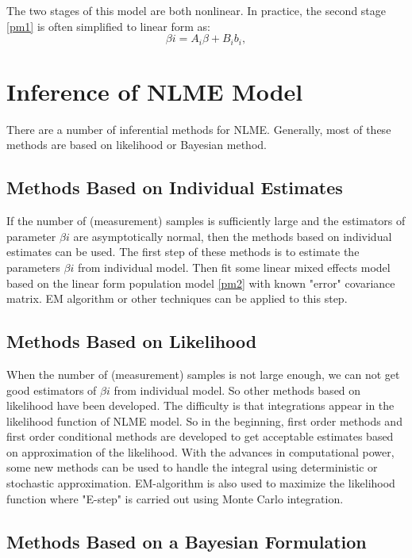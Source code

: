 \documentclass[12pt]{extarticle}
\begin{document}
The two stages of this model are both nonlinear. In practice, the second stage \eqref{pm1} is often simplified to linear form as:
\begin{equation}
\beta{i}=A_{i}\beta+B_{i}b_{i}, \label{pm2} 
\end{equation}

\section{Inference of NLME Model}
\label{sect:infer}
There are a number of inferential methods for NLME.  Generally, most of these methods are based on likelihood or Bayesian method.

\subsection{Methods Based on Individual Estimates} 
\label{sect:ie}
If the number of (measurement) samples is sufficiently large and the estimators of parameter $\beta{i}$ are asymptotically normal, then the methods based on individual estimates can be used. The first step of these methods is to estimate the parameters $\beta{i}$ from individual model. Then fit some linear mixed effects model based on the linear form population model \eqref{pm2} with known "error" covariance matrix. EM algorithm or other techniques can be applied to this step.

\subsection{Methods Based on  Likelihood}
\label{sect:likelihood}
When the number of (measurement) samples is not large enough, we can not get good estimators of  $\beta{i}$ from individual model. So other methods based on likelihood have been developed. The difficulty is that integrations appear in the likelihood function of NLME model. So in the beginning, first order methods and first order conditional methods are developed to get acceptable estimates based on approximation of the likelihood. With the advances in computational power, some new methods can be used to handle the integral using deterministic or stochastic approximation. EM-algorithm is also used to maximize the likelihood function where "E-step" is carried out using Monte Carlo integration.

\subsection{Methods Based on a Bayesian Formulation}
\label{sect:bayesian}
\end{document}
